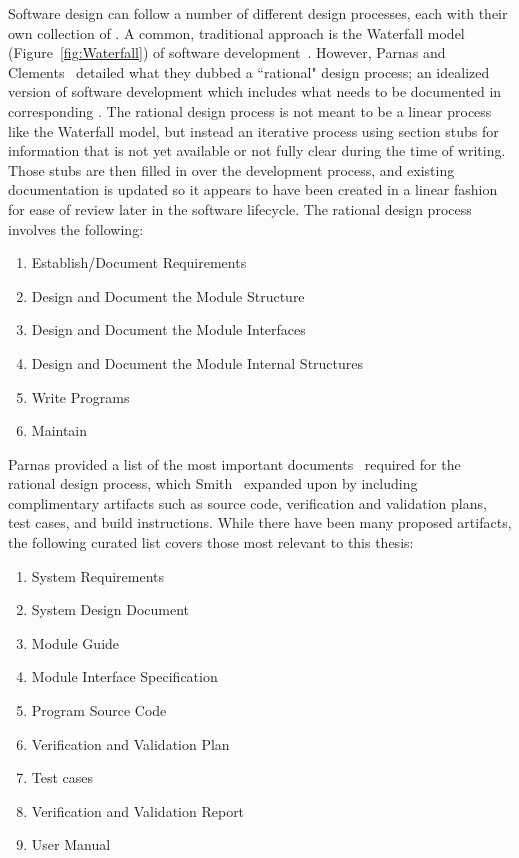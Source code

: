 Software design can follow a number of different design processes, each with 
their own collection of \sfs{}. A common, traditional approach is the Waterfall 
model (Figure~\ref{fig:Waterfall}) of software 
development~\cite{PfleegerAndAtlee2010Ch2}. 
However, Parnas and Clements~\cite{ParnasAndClements1986} detailed what they 
dubbed a ``rational" design process; an idealized version of software 
development which includes what needs to be documented in corresponding \sfs{}.
The rational design process is not meant to be a linear process like the 
Waterfall model, but instead an iterative process using section stubs for 
information that is not yet available or not fully clear during the time of 
writing. Those stubs are then filled in over the development process, and 
existing documentation is updated so it appears to have been created in a 
linear fashion for ease of review later in the software lifecycle. The rational 
design process involves the following:

\begin{enumerate}
\item Establish/Document Requirements
\item Design and Document the Module Structure
\item Design and Document the Module Interfaces
\item Design and Document the Module Internal Structures
\item Write Programs
\item Maintain
\end{enumerate}

Parnas provided a list of the most important documents~\cite{Parnas2010} 
required for the rational design process, which Smith~\cite{Smith2016} 
 expanded upon by including complimentary artifacts 
such as source code, verification and validation plans, test cases, and build 
instructions. While there have been many proposed artifacts, the following 
curated list covers those most relevant to this thesis:

\begin{enumerate}
\item System Requirements
\item System Design Document
\item Module Guide
\item Module Interface Specification
\item Program Source Code
\item Verification and Validation Plan
\item Test cases
\item Verification and Validation Report
\item User Manual
\end{enumerate}

